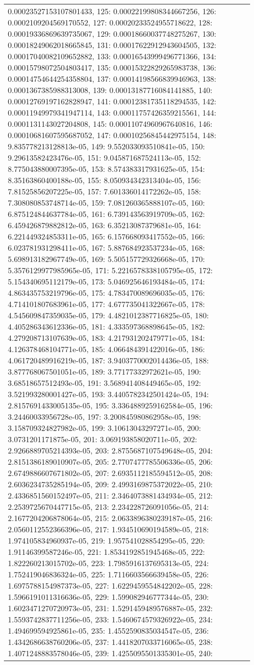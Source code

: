 \begin{tabular}{lrl}
0.00023527153107801433, 125: 0.00022199808344667256, 126: 0.0002109204569170552, 127: 0.00020233524955718622, 128: 0.00019336869639735067, 129: 0.00018660037748275267, 130: 0.00018249062018665845, 131: 0.00017622912943604505, 132: 0.00017040082109652882, 133: 0.00016543999496771366, 134: 0.00015798072504803417, 135: 0.00015322829265983738, 136: 0.00014754644254358804, 137: 0.00014198566839946963, 138: 0.0001367385988313008, 139: 0.00013187716084141885, 140: 0.00012769197162828947, 141: 0.00012381735118294535, 142: 0.00011949979341947114, 143: 0.00011757426359215561, 144: 0.0001131143027204808, 145: 0.00011074960967640816, 146: 0.00010681607595687052, 147: 0.00010256845442975154, 148: 9.835778213128813e-05, 149: 9.552033093510841e-05, 150: 9.29613582423476e-05, 151: 9.045871687524113e-05, 152: 8.775043880007395e-05, 153: 8.574383317931625e-05, 154: 8.35163860400188e-05, 155: 8.050934342313404e-05, 156: 7.81525856207225e-05, 157: 7.601336014172262e-05, 158: 7.308080853748714e-05, 159: 7.081260365888107e-05, 160: 6.875124844637784e-05, 161: 6.739143563919709e-05, 162: 6.459426879882812e-05, 163: 6.35213087379681e-05, 164: 6.221449324853311e-05, 165: 6.157668093417552e-05, 166: 6.023781931298411e-05, 167: 5.887684923537234e-05, 168: 5.698913182967749e-05, 169: 5.505157729326668e-05, 170: 5.3576129977985965e-05, 171: 5.2216578338105795e-05, 172: 5.154340695112179e-05, 173: 5.046925646193484e-05, 174: 4.863435753219796e-05, 175: 4.783470089696035e-05, 176: 4.714101807683961e-05, 177: 4.677735041322667e-05, 178: 4.545609847359035e-05, 179: 4.4821012387716825e-05, 180: 4.405286343612336e-05, 181: 4.333597368898645e-05, 182: 4.279208713107639e-05, 183: 4.217931202479771e-05, 184: 4.126378468104771e-05, 185: 4.066484391422016e-05, 186: 4.061720489916219e-05, 187: 3.9403770002014436e-05, 188: 3.877768067501051e-05, 189: 3.77177332972621e-05, 190: 3.68518657512493e-05, 191: 3.568941408449465e-05, 192: 3.521993280001427e-05, 193: 3.4405782342501424e-05, 194: 2.8157691433005135e-05, 195: 3.3364889259162584e-05, 196: 3.24460033956728e-05, 197: 3.200845980862958e-05, 198: 3.158709324827982e-05, 199: 3.10613043297271e-05, 200: 3.0731201171875e-05, 201: 3.069193858020711e-05, 202: 2.9266889705214393e-05, 203: 2.8755687107549648e-05, 204: 2.8151386189010907e-05, 205: 2.7707477785506336e-05, 206: 2.6749886607671802e-05, 207: 2.6935112185594512e-05, 208: 2.6036234735285194e-05, 209: 2.4993169875372022e-05, 210: 2.4336851560152497e-05, 211: 2.3464073881434934e-05, 212: 2.2539725670447715e-05, 213: 2.234228726091056e-05, 214: 2.1677204206878064e-05, 215: 2.0633896380239187e-05, 216: 2.0560112552366396e-05, 217: 1.934510690194589e-05, 218: 1.974105834960937e-05, 219: 1.957541028854295e-05, 220: 1.91146399587246e-05, 221: 1.8534192851945468e-05, 222: 1.822260213015702e-05, 223: 1.7985916137695313e-05, 224: 1.752419046836324e-05, 225: 1.7116603566639458e-05, 226: 1.6975788154987373e-05, 227: 1.6229459554842202e-05, 228: 1.5966191011316636e-05, 229: 1.599082946777344e-05, 230: 1.6023471270720973e-05, 231: 1.5291459489576887e-05, 232: 1.5593742837711256e-05, 233: 1.5460674579326922e-05, 234: 1.494699594925861e-05, 235: 1.4552590835034547e-05, 236: 1.4342686638760206e-05, 237: 1.4418207033716065e-05, 238: 1.4071248883578046e-05, 239: 1.4255095501335301e-05, 240: 
\end{tabular}
